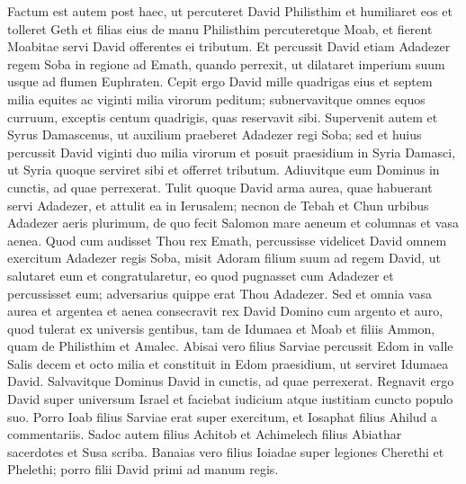\begin{biblechapter}  
\verse Factum est autem post haec, ut percuteret David Philisthim et humiliaret eos et tolleret Geth et filias eius de manu Philisthim 
\verse percuteretque Moab, et fierent Moabitae servi David offerentes ei tributum. 
\verse Et percussit David etiam Adadezer regem Soba in regione ad Emath, quando perrexit, ut dilataret imperium suum usque ad flumen Euphraten. 
\verse Cepit ergo David mille quadrigas eius et septem milia equites ac viginti milia virorum peditum; subnervavitque omnes equos curruum, exceptis centum quadrigis, quas reservavit sibi. 
\verse Supervenit autem et Syrus Damascenus, ut auxilium praeberet Adadezer regi Soba; sed et huius percussit David viginti duo milia virorum 
\verse et posuit praesidium in Syria Damasci, ut Syria quoque serviret sibi et offerret tributum. Adiuvitque eum Dominus in cunctis, ad quae perrexerat. 
\verse Tulit quoque David arma aurea, quae habuerant servi Adadezer, et attulit ea in Ierusalem; 
\verse necnon de Tebah et Chun urbibus Adadezer aeris plurimum, de quo fecit Salomon mare aeneum et columnas et vasa aenea. 
\verse Quod cum audisset Thou rex Emath, percussisse videlicet David omnem exercitum Adadezer regis Soba, 
\verse misit Adoram filium suum ad regem David, ut salutaret eum et congratularetur, eo quod pugnasset cum Adadezer et percussisset eum; adversarius quippe erat Thou Adadezer. 
\verse Sed et omnia vasa aurea et argentea et aenea consecravit rex David Domino cum argento et auro, quod tulerat ex universis gentibus, tam de Idumaea et Moab et filiis Ammon, quam de Philisthim et Amalec. 
\verse Abisai vero filius Sarviae percussit Edom in valle Salis decem et octo milia 
\verse et constituit in Edom praesidium, ut serviret Idumaea David. Salvavitque Dominus David in cunctis, ad quae perrexerat. 
\verse Regnavit ergo David super universum Israel et faciebat iudicium atque iustitiam cuncto populo suo. 
\verse Porro Ioab filius Sarviae erat super exercitum, et Iosaphat filius Ahilud a commentariis. 
\verse Sadoc autem filius Achitob et Achimelech filius Abiathar sacerdotes et Susa scriba. 
\verse Banaias vero filius Ioiadae super legiones Cherethi et Phelethi; porro filii David primi ad manum regis. 
\end{biblechapter}

